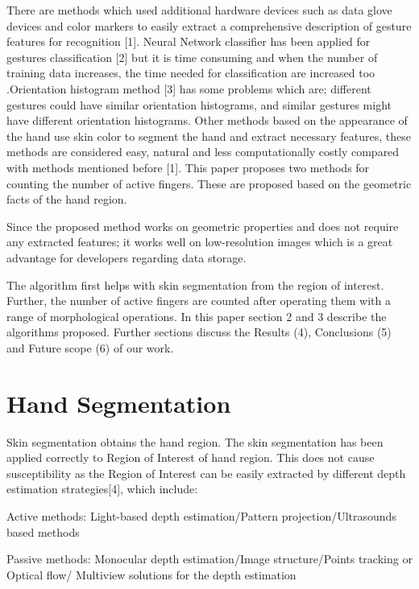 \documentclass[conference]{IEEEtran}
\begin{document}
 There are methods which used additional hardware devices such as data glove devices and color markers to easily extract a comprehensive description of gesture features for recognition [1]. Neural Network classifier has been applied for gestures classification [2] but it is time consuming and when the number of training data increases, the time needed for classification are increased too .Orientation histogram method [3] has some problems which are; different gestures could have similar orientation histograms, and similar gestures might have different orientation histograms. Other methods based on the appearance of the hand use skin color to segment the hand and extract necessary features, these methods are considered easy, natural and less computationally costly compared with methods mentioned before [1].
This paper proposes two methods for counting the number of active fingers. These are proposed based on the geometric facts of the hand region. 

Since the proposed method works on geometric properties and does not require any extracted features; it works well on low-resolution images which is a great advantage for developers regarding data storage.

The algorithm first helps with skin segmentation from the region of interest. Further, the number of active fingers are counted after operating them with a range of morphological operations.
In this paper section 2 and 3 describe the algorithms proposed. Further sections discuss the Results (4), Conclusions (5) and Future scope (6) of our work. 




\section{Hand Segmentation}

Skin segmentation obtains the hand region. The skin segmentation has been applied correctly to Region of Interest of hand region. This does not cause susceptibility as the Region of Interest can be easily extracted by different depth estimation strategies[4], which include:

Active methods:
Light-based depth estimation/Pattern projection/Ultrasounds based methods

Passive methods:
Monocular depth estimation/Image structure/Points tracking or Optical flow/ Multiview solutions for the depth estimation
\end{document}
